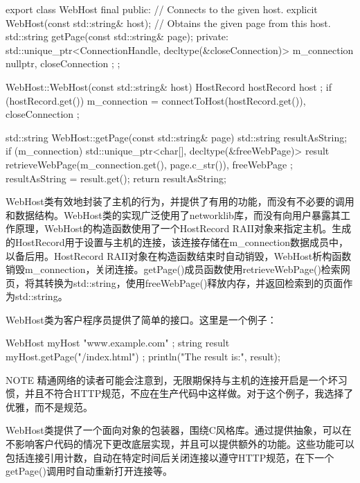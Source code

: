 \begin{cpp}
export class WebHost final
{
    public:
        // Connects to the given host.
        explicit WebHost(const std::string& host);
        // Obtains the given page from this host.
        std::string getPage(const std::string& page);
    private:
        std::unique_ptr<ConnectionHandle, decltype(&closeConnection)> m_connection
            { nullptr, closeConnection };
};

WebHost::WebHost(const std::string& host)
{
    HostRecord hostRecord { host };
    if (hostRecord.get()) {
        m_connection = { connectToHost(hostRecord.get()), closeConnection };
    }
}

std::string WebHost::getPage(const std::string& page)
{
    std::string resultAsString;
    if (m_connection) {
        std::unique_ptr<char[], decltype(&freeWebPage)> result {
            retrieveWebPage(m_connection.get(), page.c_str()),
            freeWebPage };
        resultAsString = result.get();
    }
    return resultAsString;
}
\end{cpp}

WebHost类有效地封装了主机的行为，并提供了有用的功能，而没有不必要的调用和数据结构。WebHost类的实现广泛使用了networklib库，而没有向用户暴露其工作原理，WebHost的构造函数使用了一个HostRecord RAII对象来指定主机。生成的HostRecord用于设置与主机的连接，该连接存储在m\_connection数据成员中，以备后用。HostRecord RAII对象在构造函数结束时自动销毁，WebHost析构函数销毁m\_connection，关闭连接。getPage()成员函数使用retrieveWebPage()检索网页，将其转换为std::string，使用freeWebPage()释放内存，并返回检索到的页面作为std::string。

WebHost类为客户程序员提供了简单的接口。这里是一个例子：

\begin{cpp}
WebHost myHost { "www.example.com" };
string result { myHost.getPage("/index.html") };
println("The result is:\n{}", result);
\end{cpp}

\begin{myNotic}{NOTE}
精通网络的读者可能会注意到，无限期保持与主机的连接开启是一个坏习惯，并且不符合HTTP规范，不应在生产代码中这样做。对于这个例子，我选择了优雅，而不是规范。
\end{myNotic}

WebHost类提供了一个面向对象的包装器，围绕C风格库。通过提供抽象，可以在不影响客户代码的情况下更改底层实现，并且可以提供额外的功能。这些功能可以包括连接引用计数，自动在特定时间后关闭连接以遵守HTTP规范，在下一个getPage()调用时自动重新打开连接等。

